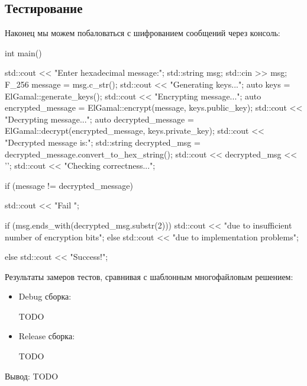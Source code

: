 \subsection{Тестирование}
Наконец мы можем побаловаться с шифрованием сообщений через консоль:
\begin{cppcode}
int main() {
    std::cout << "Enter hexadecimal message:\n";
    std::string msg;
    std::cin >> msg;
    F_256 message = msg.c_str();
    std::cout << "Generating keys...\n";
    auto keys = ElGamal::generate_keys();
    std::cout << "Encrypting message...\n";
    auto encrypted_message = ElGamal::encrypt(message, keys.public_key);
    std::cout << "Decrypting message...\n";
    auto decrypted_message = ElGamal::decrypt(encrypted_message, keys.private_key);
    std::cout << "Decrypted message is:\n";
    std::string decrypted_msg = decrypted_message.convert_to_hex_string();
    std::cout << decrypted_msg << '\n';
    std::cout << "Checking correctness...\n";

    if (message != decrypted_message) {
        std::cout << "Fail ";

        if (msg.ends_with(decrypted_msg.substr(2))) {
            std::cout << "due to insufficient number of encryption bits\n";
        } else {
            std::cout << "due to implementation problems\n";
        }
    } else {
        std::cout << "Success!\n";
    }
}
\end{cppcode}
Результаты замеров тестов, сравнивая с шаблонным многофайловым решением:
\begin{itemize}
  \item Debug сборка:

    TODO

  \item Release сборка:

    TODO
\end{itemize}

Вывод: TODO

